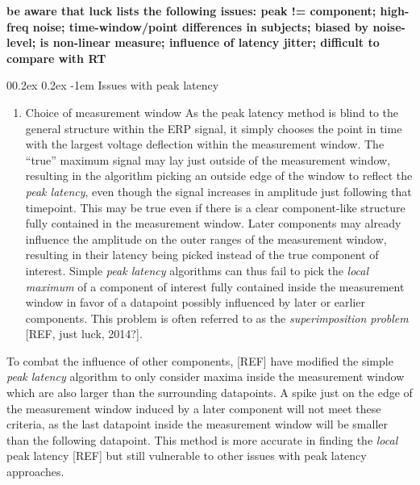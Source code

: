 \documentclass[
  man,floatsintext]{apa7}
\makeatletter
\providecommand{\tightlist}{%
  \setlength{\itemsep}{0pt}\setlength{\parskip}{0pt}}
\let\oldparagraph\paragraph
\renewcommand{\paragraph}[1]{\oldparagraph{#1}\mbox{}}
\renewcommand{\paragraph}{\@startsection{paragraph}{4}{\parindent}%
  {0\baselineskip \@plus 0.2ex \@minus 0.2ex}%
  {-1em}%
  {\normalfont\normalsize\bfseries\itshape\typesectitle}}
\renewcommand{\paragraph}{\@startsection{paragraph}{4}{\parindent}%
  {0\baselineskip \@plus 0.2ex \@minus 0.2ex}%
  {-1em}%
  {\normalfont\normalsize\bfseries\typesectitle}}
\makeatother
\begin{document}
\textbf{be aware that luck lists the following issues: peak != component; high-freq noise; time-window/point differences in subjects; biased by noise-level; is non-linear measure; influence of latency jitter; difficult to compare with RT}

\hypertarget{issues-with-peak-latency}{%
\paragraph{Issues with peak latency}\label{issues-with-peak-latency}}

\begin{enumerate}
\def\labelenumi{\arabic{enumi}.}
\tightlist
\item
  Choice of measurement window
  As the peak latency method is blind to the general structure within the ERP signal, it simply chooses the point in time with the largest voltage deflection within the measurement window. The ``true'' maximum signal may lay just outside of the measurement window, resulting in the algorithm picking an outside edge of the window to reflect the \emph{peak latency}, even though the signal increases in amplitude just following that timepoint. This may be true even if there is a clear component-like structure fully contained in the measurement window. Later components may already influence the amplitude on the outer ranges of the measurement window, resulting in their latency being picked instead of the true component of interest. Simple \emph{peak latency} algorithms can thus fail to pick the \emph{local maximum} of a component of interest fully contained inside the measurement window in favor of a datapoint possibly influenced by later or earlier components. This problem is often referred to as the \emph{superimposition problem} {[}REF, just luck, 2014?{]}.
\end{enumerate}

To combat the influence of other components, {[}REF{]} have modified the simple \emph{peak latency} algorithm to only consider maxima inside the measurement window which are also larger than the surrounding datapoints. A spike just on the edge of the measurement window induced by a later component will not meet these criteria, as the last datapoint inside the measurement window will be smaller than the following datapoint. This method is more accurate in finding the \emph{local} peak latency {[}REF{]} but still vulnerable to other issues with peak latency approaches.
\end{document}
